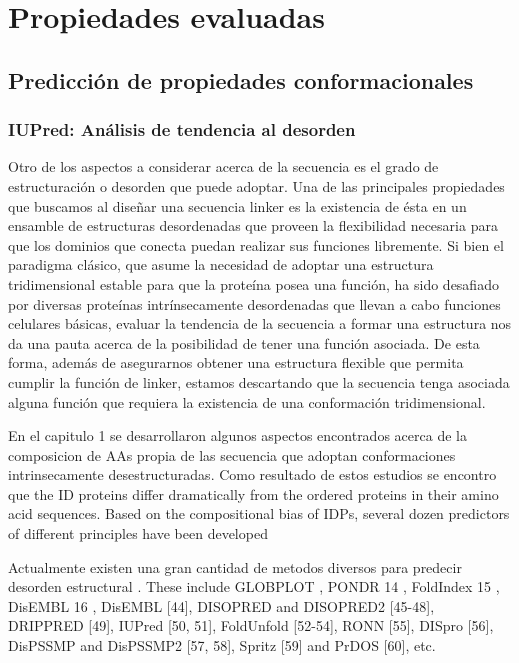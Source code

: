 \chapter{Propiedades evaluadas}

\section{Predicción de propiedades conformacionales}



\subsection{IUPred: Análisis de tendencia al desorden}


Otro de los aspectos a considerar acerca de la secuencia es el grado de estructuración o desorden que puede adoptar. 
Una de las principales propiedades que buscamos al diseñar una secuencia linker es la existencia de ésta en un ensamble
de estructuras desordenadas que proveen la flexibilidad necesaria para que los dominios que conecta puedan realizar sus funciones libremente.
Si bien el paradigma clásico, que asume la necesidad de adoptar una estructura tridimensional estable para que la proteína posea una función,
ha sido desafiado por diversas proteínas intrínsecamente desordenadas que llevan a cabo funciones celulares básicas, 
evaluar la tendencia de la secuencia a formar una estructura nos da una pauta acerca de la posibilidad de tener una función asociada. 
De esta forma, además de asegurarnos obtener una estructura flexible que permita cumplir la función de linker, 
estamos descartando que la secuencia tenga asociada alguna función que requiera la existencia de una conformación tridimensional.



En el capitulo 1 se desarrollaron algunos aspectos encontrados acerca de la composicion de AAs propia de las secuencia que adoptan conformaciones intrinsecamente desestructuradas.
Como resultado de estos estudios se encontro que the ID proteins differ dramatically from the ordered proteins in their amino acid sequences. 
Based on the compositional bias of IDPs, several dozen predictors of different principles have been developed

Actualmente existen una gran cantidad de metodos diversos para predecir desorden estructural \cite{he2009predicting}.
These include GLOBPLOT \cite{linding2003globplot}, PONDR 14 , FoldIndex 15 , DisEMBL 16 ,  DisEMBL [44], DISOPRED and DISOPRED2 [45-48],
DRIPPRED [49], IUPred [50, 51], FoldUnfold [52-54], RONN [55], DISpro [56], DisPSSMP and DisPSSMP2 [57, 58], Spritz [59] and PrDOS [60], etc.

